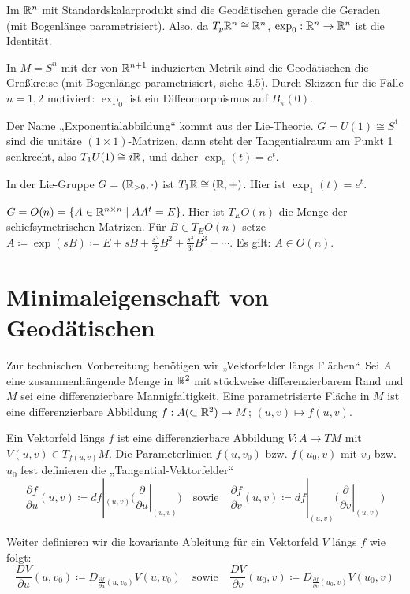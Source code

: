 \documentclass[a4paper,twoside,DIV15,BCOR12mm]{scrbook}
\renewcommand{\da}{\coloneqq}
\begin{document}
\begin{beispiele}
\item Im $\mathbb{R}^n$ mit Standardskalarprodukt sind die Geodätischen gerade die Geraden (mit Bogenlänge parametrisiert). Also, da $T_p\mathbb{R}^n \cong \mathbb{R}^n$, $\exp_0: \mathbb{R}^n \to \mathbb{R}^n$ ist die Identität.
\item In $M=S^n$ mit der von $\mathbb{R}^{n+1}$ induzierten Metrik sind die Geodätischen die Großkreise (mit Bogenlänge parametrisiert, siehe 4.5). Durch Skizzen für die Fälle $n=1,2$ motiviert: $\exp_0$ ist ein Diffeomorphismus auf $B_\pi(0)$.
\item Der Name „Exponentialabbildung“ kommt aus der Lie-Theorie. $G = U(1) \cong S^1$ sind die unitäre $(1\times 1)$-Matrizen, dann steht der Tangentialraum am Punkt 1 senkrecht, also $T_1U(1) \cong i\mathbb{R}$, und daher $\exp_0(t) = e^{t}$.
\item In der Lie-Gruppe $G=(\mathbb{R}_{>0},\cdot)$ ist $T_1\mathbb{R} \cong (\mathbb{R},+)$. Hier ist $\exp_1(t) = e^t$.
\item $G=O(n)=\{A\in \mathbb{R}^{n\times n} \mid A A^t = E \}$. Hier ist $T_EO(n)$ die Menge der schiefsymetrischen Matrizen. Für $B\in T_EO(n)$ setze $A \da \exp(sB) \da E + sB + \frac{s^2}{2}B^2 + \frac{s^3}{3!}B^3 + \cdots$. Es gilt: $A\in O(n)$.
\end{beispiele}

\section{Minimaleigenschaft von Geodätischen}

Zur technischen Vorbereitung benötigen wir „Vektorfelder längs Flächen“. Sei $A$ eine zusammenhängende Menge in $\mathbb{R}^2$ mit stückweise differenzierbarem Rand und $M$ sei eine differenzierbare Mannigfaltigkeit. Eine parametrisierte Fläche in $M$ ist eine differenzierbare Abbildung $f: A (\subset \mathbb{R}^2) \to M$; $(u,v) \mapsto f(u,v)$.

Ein Vektorfeld längs $f$ ist eine differenzierbare Abbildung $V: A \to TM$ mit $V(u,v) \in T_{f(u,v)}M$. Die Parameterlinien $f(u,v_0)$ bzw. $f(u_0,v)$ mit $v_0$ bzw. $u_0$ fest definieren die „Tangential-Vektorfelder“ 
\[
\frac {\partial f}{\partial u}(u,v) \da df|_{(u,v)} \Big(\left.\frac\partial{\partial u}\right|_{(u,v)}\Big)
\quad\text{sowie}\quad
\frac {\partial f}{\partial v}(u,v) \da df|_{(u,v)} \Big(\left.\frac\partial{\partial v}\right|_{(u,v)}\Big)
\]

Weiter definieren wir die kovariante Ableitung für ein Vektorfeld $V$ längs $f$ wie folgt:
\[
\frac{DV}{\partial u}(u,v_0) \da D_{\frac{\partial f}{\partial u}(u,v_0)} V(u,v_0)
\quad\text{sowie}\quad
\frac{DV}{\partial v}(u_0,v) \da D_{\frac{\partial f}{\partial v}(u_0,v)} V(u_0,v)
\]
\end{document}
